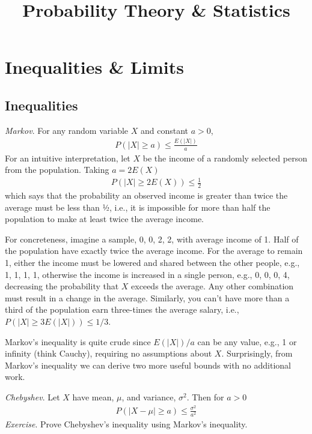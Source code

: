 \documentclass[11pt,a4paper]{article}
\title{Probability Theory \& Statistics}
\begin{document}
\maketitle
\newpage

\section{Inequalities \& Limits}

\subsection{Inequalities}

\emph{Markov}. 
For any random variable \(X\) and constant \(a > 0\),
\begin{align}
P\left( |X| \geq a \right) \leq \frac{E\left( |X| \right)}{a}
\end{align}
For an intuitive interpretation, 
let \(X\) be the income of a randomly
selected person from the population. 
Taking \(a = 2E(X)\)
\begin{align}
P\left( |X| \geq 2E(X) \right) \leq \frac{1}{2}
\end{align}
which says that the probability an observed income is greater than twice
the average must be less than ½, i.e., 
it is impossible for more than
half the population to make at least twice the average income.

For concreteness, 
imagine a sample, 0, 0, 2, 2, with average income of 1. 
Half of the population have exactly twice the average income. 
For the average to remain 1, 
either the income must be lowered and shared between the other people, 
e.g., 1, 1, 1, 1, 
otherwise the income is increased in a single person, e.g., 0, 0, 0, 4, 
decreasing the probability that \(X\) exceeds the average. 
Any other combination must result in a change in the average. 
Similarly, 
you can't have more than a third of the population 
earn three-times the average salary, i.e.,
\(P\left( |X| \geq 3E\left( |X| \right) \right) \leq 1/3\).

Markov's inequality is quite crude since \(E(|X|)/a\) can be any value,
e.g., 1 or infinity (think Cauchy), 
requiring no assumptions about \(X\). 
Surprisingly, 
from Markov's inequality we can derive two more
useful bounds with no additional work.

\emph{Chebyshev}. 
Let \(X\) have mean, \(\mu\), and variance, \(\sigma^{2}\). 
Then for \(a > 0\)
\begin{align}
P\left( |X - \mu| \geq a \right) \leq \frac{\sigma^{2}}{a^{2}}
\end{align}
\emph{Exercise}. 
Prove Chebyshev's inequality using Markov's inequality. 
\end{document}
